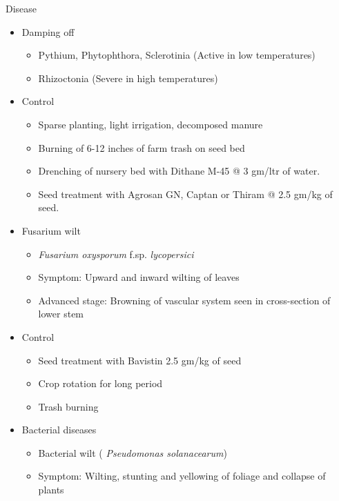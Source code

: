 \documentclass[
  ignorenonframetext,
  aspectratio=169]{beamer}
\providecommand{\tightlist}{%
  \setlength{\itemsep}{0pt}\setlength{\parskip}{0pt}}
\begin{document}
\begin{frame}{Disease}
\protect\hypertarget{disease}{}
\footnotesize

\begin{itemize}
\tightlist
\item
  Damping off

  \begin{itemize}
  \tightlist
  \item
    Pythium, Phytophthora, Sclerotinia (Active in low temperatures)
  \item
    Rhizoctonia (Severe in high temperatures)
  \end{itemize}
\item
  Control

  \begin{itemize}
  \tightlist
  \item
    Sparse planting, light irrigation, decomposed manure
  \item
    Burning of 6-12 inches of farm trash on seed bed
  \item
    Drenching of nursery bed with Dithane M-45 @ 3 gm/ltr of water.
  \item
    Seed treatment with Agrosan GN, Captan or Thiram @ 2.5 gm/kg of
    seed.
  \end{itemize}
\item
  Fusarium wilt

  \begin{itemize}
  \tightlist
  \item
    \emph{Fusarium oxysporum} f.sp. \emph{lycopersici}
  \item
    Symptom: Upward and inward wilting of leaves
  \item
    Advanced stage: Browning of vascular system seen in cross-section of
    lower stem
  \end{itemize}
\item
  Control

  \begin{itemize}
  \tightlist
  \item
    Seed treatment with Bavistin 2.5 gm/kg of seed
  \item
    Crop rotation for long period
  \item
    Trash burning
  \end{itemize}
\item
  Bacterial diseases

  \begin{itemize}
  \tightlist
  \item
    Bacterial wilt ( \emph{Pseudomonas solanacearum})
  \item
    Symptom: Wilting, stunting and yellowing of foliage and collapse of
    plants
  \end{itemize}
\end{itemize}
\end{frame}
\end{document}
